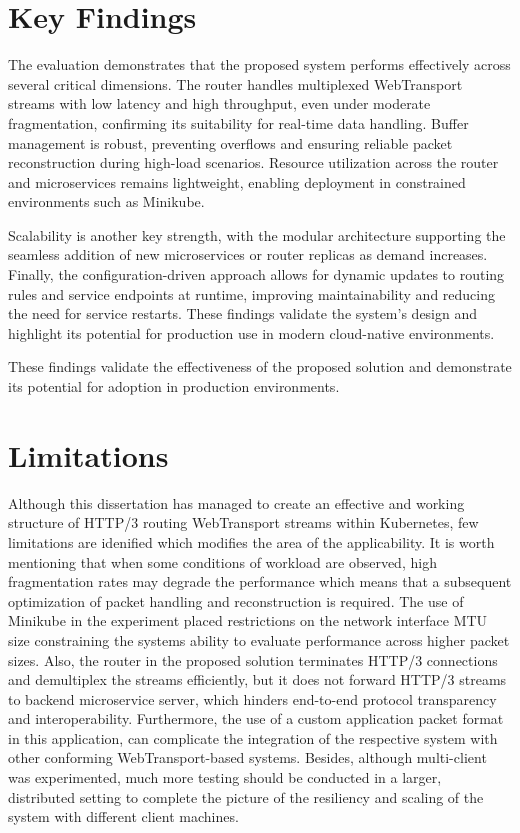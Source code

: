 \section{Key Findings}

The evaluation demonstrates that the proposed system performs effectively across several critical dimensions. The router handles multiplexed WebTransport streams with low latency and high throughput, even under moderate fragmentation, confirming its suitability for real-time data handling. Buffer management is robust, preventing overflows and ensuring reliable packet reconstruction during high-load scenarios. Resource utilization across the router and microservices remains lightweight, enabling deployment in constrained environments such as Minikube.

Scalability is another key strength, with the modular architecture supporting the seamless addition of new microservices or router replicas as demand increases. Finally, the configuration-driven approach allows for dynamic updates to routing rules and service endpoints at runtime, improving maintainability and reducing the need for service restarts. These findings validate the system’s design and highlight its potential for production use in modern cloud-native environments.

These findings validate the effectiveness of the proposed solution and demonstrate its potential for adoption in production environments.

\section{Limitations}

Although this dissertation has managed to create an effective and working structure of HTTP/3 routing WebTransport streams within Kubernetes, few limitations are idenified which modifies the area of the applicability. It is worth mentioning that when some conditions of workload are observed, high fragmentation rates may degrade the performance which means that a subsequent optimization of packet handling and reconstruction is required. The use of Minikube in the experiment placed restrictions on the network interface MTU size constraining the systems ability to evaluate performance across higher packet sizes. Also, the router in the proposed solution terminates HTTP/3 connections and demultiplex the streams efficiently, but it does not forward HTTP/3 streams to backend microservice server, which hinders end-to-end protocol transparency and interoperability. Furthermore, the use of a custom application packet format in this application, can complicate the integration of the respective system with other conforming WebTransport-based systems. Besides, although multi-client was experimented, much more testing should be conducted in a larger, distributed setting to complete the picture of the resiliency and scaling of the system with different client machines.

